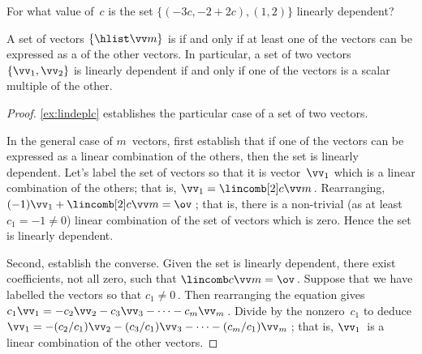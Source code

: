 \begin{activity}
For what value of~\(c\) is the set \(\{(-3c,-2+2c),(1,2)\}\) linearly dependent?
\end{activity}




\begin{theorem} \label{thm:lindeplc} 
A set of vectors \(\{\hlist\vv m\}\) is  if and only if at least one of the vectors can be expressed as a  of the other vectors.
In particular, a set of two vectors \(\{\vv_1,\vv_2\}\) is linearly dependent if and only if one of the vectors is a scalar multiple of the other.
\end{theorem}

\begin{proof} 
\cref{ex:lindeplc} establishes the particular case of a set of two vectors.

In the general case of \(m\)~vectors, first establish that if one of the vectors can be expressed as a {linear combination} of the others, then the set is linearly dependent.
Let's label the set of vectors so that it is vector~\(\vv_1\) which is a linear combination of the others; that is, \(\vv_1=\lincomb[2]c\vv m\)\,.
Rearranging, \((-1)\vv_1+\lincomb[2]c\vv m=\ov\)\,; that is, there is a non-trivial (as at least \(c_1=-1\neq0\)) linear combination of the set of vectors which is zero.
Hence the set is linearly dependent.

Second, establish the converse.  
Given the set is linearly dependent, there exist coefficients, not all zero, such that \(\lincomb c\vv m=\ov\)\,.  
Suppose that we have labelled the vectors so that \(c_1\neq 0\)\,.  
Then rearranging the equation gives
\(c_1\vv_1=-c_2\vv_2-c_3\vv_3-\cdots-c_m\vv_m\)\,.
Divide by the nonzero~\(c_1\) to deduce
\(\vv_1=-(c_2/c_1)\vv_2-(c_3/c_1)\vv_3-\cdots-(c_m/c_1)\vv_m\)\,;
that is, \(\vv_1\)~is a linear combination of the other vectors.
\end{proof}


